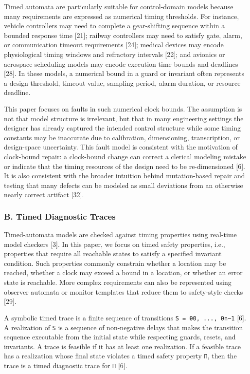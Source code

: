 \documentclass[
]{article}
\begin{document}
Timed automata are particularly suitable for control-domain models
because many requirements are expressed as numerical timing thresholds.
For instance, vehicle controllers may need to complete a gear-shifting
sequence within a bounded response time {[}21{]}; railway controllers
may need to satisfy gate, alarm, or communication timeout requirements
{[}24{]}; medical devices may encode physiological timing windows and
refractory intervals {[}22{]}; and avionics or aerospace scheduling
models may encode execution-time bounds and deadlines {[}28{]}. In these
models, a numerical bound in a guard or invariant often represents a
design threshold, timeout value, sampling period, alarm duration, or
resource deadline.

This paper focuses on faults in such numerical clock bounds. The
assumption is not that model structure is irrelevant, but that in many
engineering settings the designer has already captured the intended
control structure while some timing constants may be inaccurate due to
calibration, dimensioning, transcription, or design-space uncertainty.
This fault model is consistent with the motivation of clock-bound
repair: a clock-bound change can correct a clerical modeling mistake or
indicate that the timing resources of the design need to be
re-dimensioned {[}6{]}. It is also consistent with the broader intuition
behind mutation-based repair and testing that many defects can be
modeled as small deviations from an otherwise nearly correct artifact
{[}32{]}.

\subsubsection{B. Timed Diagnostic
Traces}\label{b.-timed-diagnostic-traces}

Timed-automata models are checked against timing properties using
real-time model checkers {[}3{]}. In this paper, we focus on timed
safety properties, i.e., properties that require all reachable states to
satisfy a specified invariant condition. Such properties commonly
constrain whether a location may be reached, whether a clock may exceed
a bound in a location, or whether an error state is reachable. More
complex requirements can also be represented using observer automata or
monitor templates that reduce them to safety-style checks {[}29{]}.

A symbolic timed trace is a finite sequence of transitions
\texttt{S\ =\ θ0,\ ...,\ θn−1} {[}6{]}. A realization of \texttt{S} is a
sequence of non-negative delays that makes the transition sequence
executable from the initial state while respecting guards, resets, and
invariants. A trace is feasible if it has at least one realization. If a
feasible trace has a realization whose final state violates a timed
safety property \texttt{Π}, then the trace is a timed diagnostic trace
for \texttt{Π} {[}6{]}.
\end{document}
